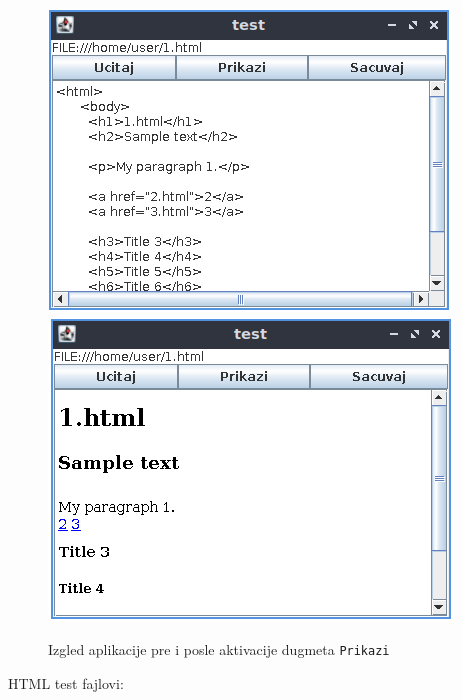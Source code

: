 \documentclass[]{article}
\begin{document}
\begin{figure}[H]
  \centering
  \includegraphics[scale=0.7]{fig1.PNG}
  \includegraphics[scale=0.7]{fig2.PNG}
  \label{fig2}
  \caption{Izgled aplikacije pre i posle aktivacije dugmeta \texttt{Prikazi}}
\end{figure}


\newpage

HTML test fajlovi:\\
\end{document}
